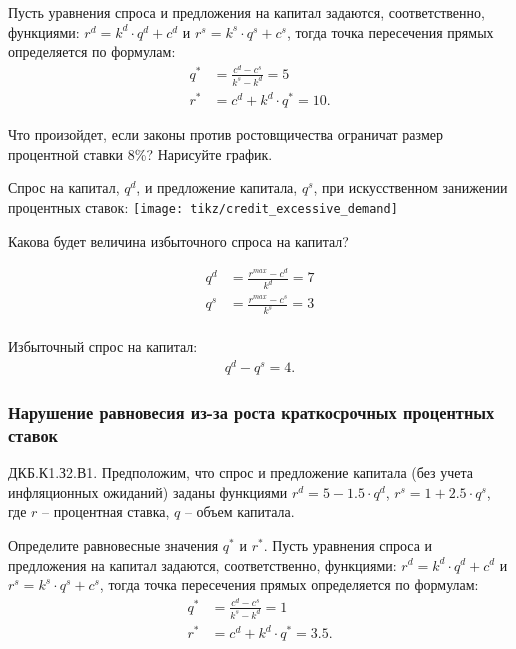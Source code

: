 \documentclass[12pt, table, a4paper,twoside]{exam}
\begin{document}
\begin{questions}
\begin{subparts}
\begin{solution}[12em]
	Пусть уравнения спроса и предложения на капитал задаются, соответственно, функциями: $r^d=k^d\cdot q^d +c^d$ и $r^s=k^s\cdot q^s +c^s$, тогда точка пересечения прямых определяется по формулам:
	\begin{align*}
	q^*&=\frac{c^d-c^s}{k^s-k^d}=5\\
	r^*&=c^d + k^d \cdot q^* =10.
	\end{align*}
	\end{solution}
	
	\subpart[4] Что произойдет, если законы против ростовщичества ограничат размер процентной ставки 8\%? Нарисуйте график. 
	\begin{solution}[12em]
		Спрос на капитал, $q^d$,  и предложение капитала, $q^s$, при искусственном занижении процентных ставок:
		\centering
		\texttt{[image: tikz/credit\_excessive\_demand]}
		
		\raggedright
	\end{solution}
	
	\subpart[4] Какова будет величина избыточного спроса на капитал?
	\begin{solution}[12em]

		\begin{align*}
		q^d&=\frac{r^{max}-c^d}{k^d}=7\\
		q^s&=\frac{r^{max}-c^s}{k^s}=3\\
		\end{align*}

		Избыточный спрос на капитал:
		\begin{align*}
		q^d- q^s=4.
		\end{align*}
	\end{solution}
	
\end{subparts}
\addpoints


\subsubsection{Нарушение равновесия из-за роста краткосрочных процентных ставок}
\question[10] ДКБ.К1.З2.В1. Предположим, что спрос и предложение капитала (без учета инфляционных ожиданий) заданы функциями 	
$r^d=5-1.5 \cdot q^d$, $r^s=1 + 2.5 \cdot q^s$, где 	
$r$ – процентная ставка, 	
$q$ – объем капитала.	
\noaddpoints
\begin{subparts}
	\subpart[3] Определите равновесные значения $q^*$ и $r^*$.
	Пусть уравнения спроса и предложения на капитал задаются, соответственно, функциями: $r^d=k^d\cdot q^d +c^d$ и $r^s=k^s\cdot q^s +c^s$, тогда точка пересечения прямых определяется по формулам:
	\begin{align*}
	q^*&=\frac{c^d-c^s}{k^s-k^d}=1\\
	r^*&=c^d + k^d \cdot q^* =3.5.
	\end{align*}
	\begin{solution}[12em]
	\end{solution}
	

\end{subparts}
\end{questions}
\end{document}
